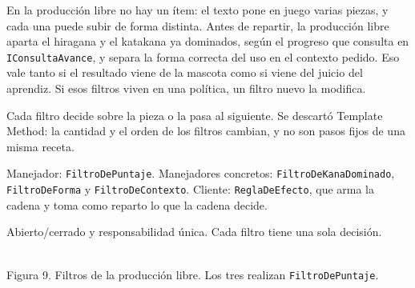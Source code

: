 \documentclass[11pt]{article}
\begin{document}
\begin{description}
  \raggedright
  \item[Problema.] En la producción libre no hay un ítem: el texto pone en juego varias piezas, y cada una puede subir de forma distinta. Antes de repartir, la producción libre aparta el hiragana y el katakana ya dominados, según el progreso que consulta en \texttt{IConsultaAvance}, y separa la forma correcta del uso en el contexto pedido. Eso vale tanto si el resultado viene de la mascota como si viene del juicio del aprendiz. Si esos filtros viven en una política, un filtro nuevo la modifica.
  \item[Solución.] Cada filtro decide sobre la pieza o la pasa al siguiente. Se descartó Template Method: la cantidad y el orden de los filtros cambian, y no son pasos fijos de una misma receta.
  \item[Participantes.] Manejador: \texttt{FiltroDePuntaje}. Manejadores concretos: \texttt{FiltroDeKanaDominado}, \texttt{FiltroDeForma} y \texttt{FiltroDeContexto}. Cliente: \texttt{ReglaDeEfecto}, que arma la cadena y toma como reparto lo que la cadena decide.
  \item[SOLID.] Abierto/cerrado y responsabilidad única. Cada filtro tiene una sola decisión.
\end{description}

\begin{center}
\\[0.15em]
{\small Figura 9. Filtros de la producción libre. Los tres realizan \texttt{FiltroDePuntaje}.}
\end{center}
\end{document}
